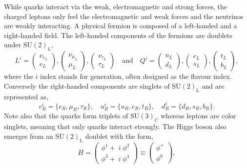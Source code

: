 \documentclass[10pt]{book}
\newcommand{\SU}[1]{\mathrm{SU}(2)_{\mathrm{#1}}}
\renewcommand{\(}{\left(}
\renewcommand{\)}{\right)}
\renewcommand{\[}{\left[}
\renewcommand{\]}{\right]}
\begin{document}
%
While quarks interact via the weak, electromagnetic and strong forces, the charged leptons only feel the electromagnetic and weak forces and the neutrinos are weakly interacting.  
%
A physical fermion is composed of a left-handed and a right-handed field. The left-handed components of the fermions are doublets under $\mathrm{SU(2)}_L$, 
%
\begin{equation}
L^i= \begin{pmatrix}
\nu_{e_L} \\ e_L 
\end{pmatrix},
\begin{pmatrix}
\nu_{\mu_L} \\ \mu_L 
\end{pmatrix},
\begin{pmatrix}
\nu_{\tau_L} \\ \tau_L 
\end{pmatrix} 
\quad 
\text{and} \quad Q^i= \begin{pmatrix}
u_{L} \\
d_L 
\end{pmatrix},\begin{pmatrix}
c_{L} \\
s_L 
\end{pmatrix}
,\begin{pmatrix}
t_{L} \\
b_L 
\end{pmatrix} ,
\end{equation}
%
where the $i$ index stands for generation, often designed as the flavour index. Conversely the right-handed components are singlets of  $\SU{L}$ and are represented as,
%
 \begin{equation}
e^i_R=\{e_R,\mu_R,\tau_R\}, \quad  u^i_R=\{u_R,c_R,t_R\}, \quad d^i_R=\{d_{R},s_{R},b_{R}\} . 
\end{equation}
%
Note also that the quarks form triplets of $\mathrm{SU(3)_C}$ whereas leptons are color singlets, meaning that only quarks interact strongly. 
%
The Higgs boson also emerges from an $\mathrm{SU(2)_L}$ doublet with the form,
%
\begin{equation}
H=\begin{pmatrix}
\phi^1 + \; i \; \phi^2 \\
\phi^3 + \; i \; \phi^4  
\end{pmatrix} \equiv \begin{pmatrix}
\phi^+ \\
\phi^0 
\end{pmatrix}, 
\end{equation}
\end{document}
